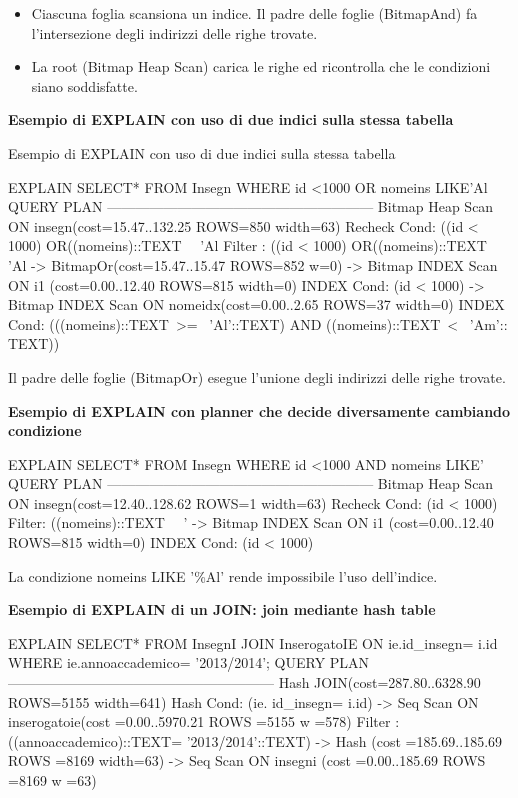 \begin{itemize}
  \item Ciascuna foglia scansiona un indice. Il padre delle foglie (BitmapAnd) fa l’intersezione degli indirizzi delle righe trovate.
  \item La root (Bitmap Heap Scan) carica le righe ed ricontrolla che le condizioni siano soddisfatte.
\end{itemize}

\textbf{Esempio di EXPLAIN con uso di due indici sulla stessa tabella}


Esempio di EXPLAIN con uso di due indici sulla stessa tabella
\begin{codiceSQL}
  EXPLAIN SELECT* FROM Insegn WHERE id <1000 OR nomeins LIKE'Al%
QUERY PLAN
---------------------------------------------------------
Bitmap Heap Scan ON insegn(cost=15.47..132.25 ROWS=850 width=63)
Recheck Cond: ((id < 1000) OR((nomeins)::TEXT~~ 'Al%
Filter : ((id < 1000) OR((nomeins)::TEXT~~ 'Al%
-> BitmapOr(cost=15.47..15.47 ROWS=852 w=0)
-> Bitmap INDEX Scan ON i1 (cost=0.00..12.40 ROWS=815 width=0)
INDEX Cond: (id < 1000)
-> Bitmap INDEX Scan ON nomeidx(cost=0.00..2.65 ROWS=37 width=0)
INDEX Cond: (((nomeins)::TEXT~>=~ 'Al'::TEXT) AND
((nomeins)::TEXT~<~ 'Am':: TEXT))
\end{codiceSQL}

Il padre delle foglie (BitmapOr) esegue l’unione degli indirizzi delle righe trovate.

\textbf{Esempio di EXPLAIN con planner che decide diversamente cambiando condizione}

\begin{codiceSQL}
EXPLAIN SELECT* FROM Insegn WHERE id <1000 AND nomeins LIKE'%
QUERY PLAN
---------------------------------------------------------
Bitmap Heap Scan ON insegn(cost=12.40..128.62 ROWS=1 width=63)
Recheck Cond: (id < 1000)
Filter: ((nomeins)::TEXT~~ '%
-> Bitmap INDEX Scan ON i1 (cost=0.00..12.40 ROWS=815 width=0)
INDEX Cond: (id < 1000)
\end{codiceSQL}

La condizione nomeins LIKE '\%Al' rende impossibile l’uso dell'indice.

\textbf{Esempio di EXPLAIN di un JOIN: join mediante hash table}
\begin{codiceSQL}  
EXPLAIN SELECT* FROM InsegnI JOIN InserogatoIE ON ie.id_insegn= i.id WHERE ie.annoaccademico= '2013/2014';
QUERY PLAN
---------------------------------------------------------
Hash JOIN(cost=287.80..6328.90 ROWS=5155 width=641)
Hash Cond: (ie. id_insegn= i.id)
-> Seq Scan ON inserogatoie(cost =0.00..5970.21 ROWS =5155 w =578)
Filter : ((annoaccademico)::TEXT= '2013/2014'::TEXT)
-> Hash (cost =185.69..185.69 ROWS =8169 width=63)
-> Seq Scan ON insegni (cost =0.00..185.69 ROWS =8169 w =63)
\end{codiceSQL}

